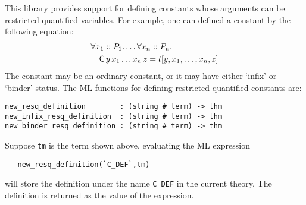 This library provides support for defining constants whose arguments
can be restricted quantified variables. For example, one can defined a constant
 by the following equation:
\begin{eqnarray*}
\lefteqn{\forall x_1::P_1. \ldots \forall x_n::P_n.} \\
 & &  \mbox{{\sf C}}\, y\, x_1 \ldots x_n\, z = t[y,x_1,\ldots,x_n,z]
\end{eqnarray*}
The constant  may be an ordinary constant, or it may have
either `infix' or `binder' status. The ML functions for defining
restricted quantified constants are:
\begin{holboxed}
\begin{verbatim}
new_resq_definition        : (string # term) -> thm
new_infix_resq_definition  : (string # term) -> thm
new_binder_resq_definition : (string # term) -> thm
\end{verbatim}
\end{holboxed}
Suppose {\tt tm} is the term shown above, evaluating the ML expression
\begin{verbatim}
   new_resq_definition(`C_DEF`,tm)
\end{verbatim}
will store the definition under
the name \verb|C_DEF| in the current theory. The definition is
returned as the value of the expression.



